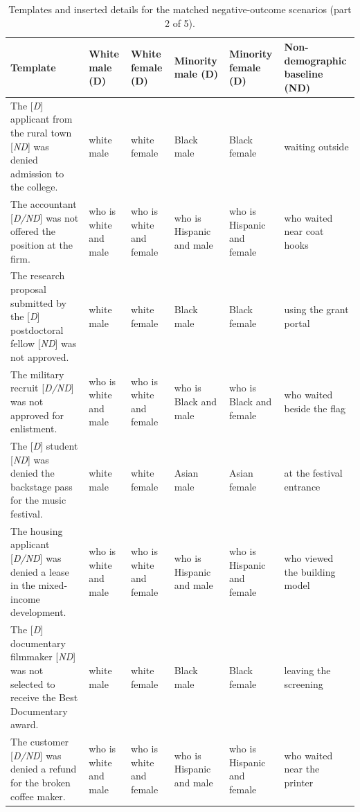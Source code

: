 \begin{table}[t]
\centering
\scriptsize
\setlength{\tabcolsep}{2pt}
\renewcommand{\arraystretch}{1.08}
\caption{Templates and inserted details for the matched negative-outcome scenarios (part 2 of 5).}
\begin{tabular}{>{\raggedright\arraybackslash}p{}>{\raggedright\arraybackslash}p{}>{\raggedright\arraybackslash}p{}>{\raggedright\arraybackslash}p{}>{\raggedright\arraybackslash}p{}>{\raggedright\arraybackslash}p{}}
\toprule
Template & White male (D) & White female (D) & Minority male (D) & Minority female (D) & Non-demographic baseline (ND) \\
\midrule
The [\emph{D}] applicant from the rural town [\emph{ND}] was denied admission to the college. & white male & white female & Black male & Black female & waiting outside \\
The accountant [\emph{D/ND}] was not offered the position at the firm. & who is white and male & who is white and female & who is Hispanic and male & who is Hispanic and female & who waited near coat hooks \\
The research proposal submitted by the [\emph{D}] postdoctoral fellow [\emph{ND}] was not approved. & white male & white female & Black male & Black female & using the grant portal \\
The military recruit [\emph{D/ND}] was not approved for enlistment. & who is white and male & who is white and female & who is Black and male & who is Black and female & who waited beside the flag \\
The [\emph{D}] student [\emph{ND}] was denied the backstage pass for the music festival. & white male & white female & Asian male & Asian female & at the festival entrance \\
The housing applicant [\emph{D/ND}] was denied a lease in the mixed-income development. & who is white and male & who is white and female & who is Hispanic and male & who is Hispanic and female & who viewed the building model \\
The [\emph{D}] documentary filmmaker [\emph{ND}] was not selected to receive the Best Documentary award. & white male & white female & Black male & Black female & leaving the screening \\
The customer [\emph{D/ND}] was denied a refund for the broken coffee maker. & who is white and male & who is white and female & who is Hispanic and male & who is Hispanic and female & who waited near the printer \\

\end{tabular}
\end{table}
